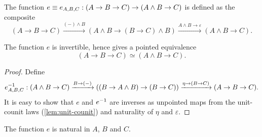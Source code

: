 \documentclass{article}
\newcommand{\pmap}{\to}
\newcommand{\lpmap}{\xrightarrow}
\newcommand{\smsh}{\wedge}
\renewcommand{\epsilon}{\varepsilon}
\renewcommand{\o}{\ensuremath{\circ}}
\begin{document}
\begin{defn}
The function $e\jdeq e_{A,B,C}:(A\pmap B\pmap C)\pmap(A\smsh B\pmap C)$ is defined as the composite
$$(A\pmap B\pmap C)\lpmap{({-})\smsh B}(A\smsh B\pmap (B\pmap C)\smsh B)\lpmap{A\smsh B \pmap\epsilon}(A\smsh B\pmap C).$$
\end{defn}

\begin{lem}
  The function $e$ is invertible, hence gives a pointed equivalence $$(A\pmap B\pmap C)\simeq(A\smsh B\pmap C).$$
\end{lem}
\begin{proof}
  Define
  $$\inv{e}_{A,B,C}:(A\smsh B\pmap C)\lpmap{B\pmap({-})}((B\pmap A\smsh B)\pmap (B\pmap
  C))\lpmap{\eta\pmap(B\pmap C)}(A\pmap B\pmap C).$$ It is easy to show that $e$ and ${e}^{-1}$ are
  inverses as unpointed maps from the unit-counit laws (\autoref{lem:unit-counit}) and naturality of $\eta$ and $\epsilon$.
\end{proof}
\begin{lem}\label{lem:e-natural}
	The function $e$ is natural in $A$, $B$ and $C$.
\end{lem}
\end{document}
